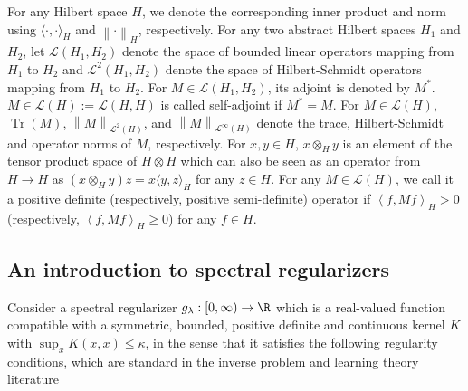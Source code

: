 \documentclass{article} %
\newcommand{\HS}{\mathcal{L}^{2}}
\newcommand{\gl}{g_{\lambda}}
\newcommand{\norm}[1]{\left\|#1\right\|}
\newcommand{\inprod}[1]{\left \langle #1 \right\rangle}
\theoremstyle{plain}
\begin{document}
For any Hilbert space $H$, we denote the corresponding inner product and norm using $\langle \cdot,\cdot\rangle_{H}$ and $\norm{\cdot}_{H}$, respectively. For any two abstract Hilbert spaces $H_1$ and $H_2$, let $\mathcal{L}(H_1, H_2)$ denote the space of bounded linear operators mapping from $H_1$ to $H_2$ and $\HS(H_{1},H_{2})$ denote the space of Hilbert-Schmidt operators mapping from $H_1$ to $H_2$. For $M \in \mathcal{L}(H_1,H_2)$, its adjoint is denoted by $M^*$. $M \in \mathcal{L}(H) := \mathcal{L}(H,H)$ is called self-adjoint if $M^*=M$. For $M \in \mathcal{L}(H)$, $\operatorname{Tr}(M)$, $\norm{M}_{\mathcal{L}^2(H)}$, and $\norm{M}_{\mathcal{L}^{\infty}(H)}$ denote the trace, Hilbert-Schmidt and operator norms of $M$, respectively. For $x,y \in H$, $x \otimes_{H} y$ is an element of the tensor product space of $H \otimes H$ which can also be seen as an operator from $H \to H$ as $(x \otimes_{H}y)z=x\langle y,z \rangle_{H} $ for any $z \in H$. For any $M\in \mathcal{L}(H)$, we call it a positive definite (respectively, positive semi-definite) operator if $\inprod{f,Mf}_{H} >0$ (respectively, $\inprod{f,Mf}_{H} \geq 0$) for any $f \in H$.

\subsection{An introduction to spectral regularizers}\label{subsec: An introduction to spectral regularizers}

 Consider a spectral regularizer $\gl: [0,\infty) \to \R$ which is a real-valued function compatible with a symmetric, bounded, positive definite and continuous kernel $K$ with $\sup_x K(x,x) \leq \kappa$, in the sense that it satisfies the following regularity conditions, which are standard in the inverse problem and learning theory literature \citep{bauer2007regularization,hagrass2024spectral}
\end{document}

